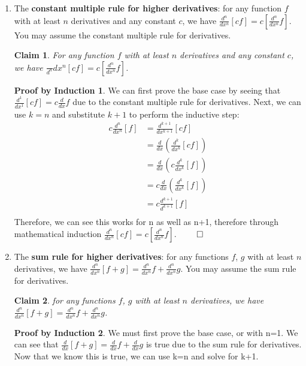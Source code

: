\documentclass[11pt]{letter}
\newtheorem{claim}{Claim}
\theoremstyle{definition}
\newtheorem{PBI}{Proof by Induction}
\begin{document}
\begin{description}
\begin{enumerate}
			\item The {\bfseries constant multiple rule for higher derivatives}: for any function $f$ with at least $n$ derivatives and any constant $c$, we have $\frac{d^n}{dx^n}\left[cf\right]=c\left[\frac{d^n}{dx^n}f\right]$. You may assume the constant multiple rule for derivatives.
\begin{claim}
For any function $f$ with at least $n$ derivatives and any constant $c$, we have $\frac\
{d^n}{dx^n}\left[cf\right]=c\left[\frac{d^n}{dx^n}f\right]$.
\end{claim}
\begin{PBI}
We can first prove the base case by seeing that $\frac{d^1}{dx^1}[cf]=c\frac{d}{dx}f$ due to the constant multiple rule for derivatives. Next, we can use $k=n$ and substitute $k+1$  to perform the inductive step: \\
\begin{align*}
c \frac{d^{n}}{dx^{n}}[f]&=\frac{d^{k+1}}{dx^{k+1}}[cf] \\
&=\frac{d}{dx}(\frac{d^{k}}{dx^{k}}[cf]) \\
&=\frac{d}{dx}(c\frac{d^k}{dx^k}[f]) \tag{Substituted using equation given in claim} \\
&=c\frac{d}{dx}(\frac{d^k}{dx^k}[f]) \tag{Used constant multiple rule for derivatives} \\
&=c\frac{d^{k+1}}{d^{k+1}}[f] \\
\end{align*}
Therefore, we can see this works for n as well as n+1, therefore through mathematical induction $\frac{d^n}{dx^n}\left[cf\right]=c\left[\frac{d^n}{dx^n}f\right]$. $\qed$
\end{PBI}
			\item The {\bfseries sum rule for higher derivatives}: for any functions $f$, $g$ with at least $n$ derivatives, we have $\frac{d^n}{dx^n}\left[f+g\right]=\frac{d^n}{dx^n}f+\frac{d^n}{dx^n}g$. You may assume the sum rule for derivatives.
                          \begin{claim}
                            for any functions $f$, $g$ with at least $n$ derivatives, we have $\frac{d^n}{dx^n}\left[f+g\right]=\frac{d^n}{dx^n}f+\frac{d^n}{dx^n}g$.
                            \end{claim}
                          \begin{PBI}
                            We must first prove the base case, or with n=1. We can see that  $\frac{d}{dx}\left[f+g\right]=\frac{d}{dx}f+\frac{d}{dx}g$ is true due to the sum rule for derivatives. Now that we know this is true, we can use k=n and solve for k+1. \\

\end{PBI}
\end{enumerate}
\end{description}
\end{document}
